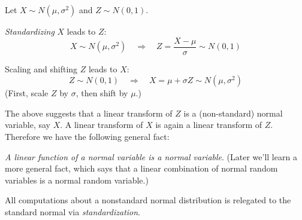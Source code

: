 \documentclass[12pt]{article}
\begin{document}
% 
% 
% 
% 
% 

Let $X \sim N(\mu, \sigma^2)$ and $Z \sim N(0,1)$.

\emph{Standardizing} $X$ leads to $Z$:
\[
X \sim N(\mu,\sigma^2)
    \quad\Rightarrow\quad
        Z = \frac{X - \mu}{\sigma} \sim N(0,1)
\]

Scaling and shifting $Z$ leads to $X$:
\[
Z \sim N(0,1)
    \quad\Rightarrow\quad
        X = \mu + \sigma Z \sim N(\mu,\sigma^2)
\]
(First, scale $Z$ by $\sigma$, then shift by $\mu$.)

The above suggests that a linear transform of $Z$ is a (non-standard)
normal variable, say $X$. A linear transform of $X$ is again a linear
transform of $Z$. Therefore we have the following general fact:

\emph{A linear function of a normal variable is a normal variable}.
(Later we'll learn a more general fact, which says that
a linear combination of normal random variables is a normal random
variable.)

All computations about a nonstandard normal distribution
is relegated to the standard normal via \emph{standardization}.
\end{document}
